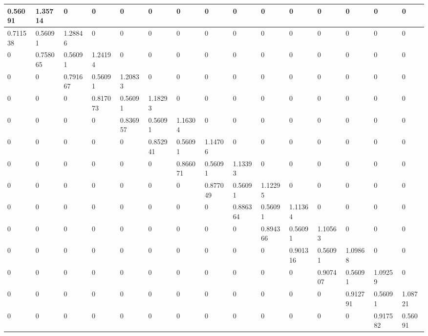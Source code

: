 \begin{tabular}{|l|l|l|l|l|l|l|l|l|l|l|l|l|l|l|}
\hline
0.56091&1.35714&0&0&0&0&0&0&0&0&0&0&0&0&0\\\hline
0.711538&0.56091&1.28846&0&0&0&0&0&0&0&0&0&0&0&0\\\hline
0&0.758065&0.56091&1.24194&0&0&0&0&0&0&0&0&0&0&0\\\hline
0&0&0.791667&0.56091&1.20833&0&0&0&0&0&0&0&0&0&0\\\hline
0&0&0&0.817073&0.56091&1.18293&0&0&0&0&0&0&0&0&0\\\hline
0&0&0&0&0.836957&0.56091&1.16304&0&0&0&0&0&0&0&0\\\hline
0&0&0&0&0&0.852941&0.56091&1.14706&0&0&0&0&0&0&0\\\hline
0&0&0&0&0&0&0.866071&0.56091&1.13393&0&0&0&0&0&0\\\hline
0&0&0&0&0&0&0&0.877049&0.56091&1.12295&0&0&0&0&0\\\hline
0&0&0&0&0&0&0&0&0.886364&0.56091&1.11364&0&0&0&0\\\hline
0&0&0&0&0&0&0&0&0&0.894366&0.56091&1.10563&0&0&0\\\hline
0&0&0&0&0&0&0&0&0&0&0.901316&0.56091&1.09868&0&0\\\hline
0&0&0&0&0&0&0&0&0&0&0&0.907407&0.56091&1.09259&0\\\hline
0&0&0&0&0&0&0&0&0&0&0&0&0.912791&0.56091&1.08721\\\hline
0&0&0&0&0&0&0&0&0&0&0&0&0&0.917582&0.56091\\\hline
\end{tabular}